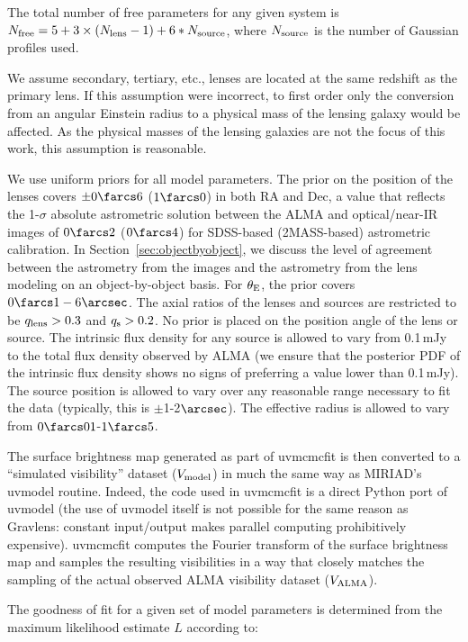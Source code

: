 \documentclass[iop]{emulateapj}
\begin{document}
The total number of free parameters for any given system is $N_{\rm free} = 5 +
3 \times (N_{\rm lens} - 1) + 6 * N_{\rm source}$, where $N_{\rm source}$ is
the number of Gaussian profiles used.

We assume secondary, tertiary, etc., lenses are located at the same redshift as
the primary lens.  If this assumption were incorrect, to first order only the
conversion from an angular Einstein radius to a physical mass of the lensing
galaxy would be affected.  As the physical masses of the lensing galaxies are
not the focus of this work, this assumption is reasonable.

We use uniform priors for all model parameters.  The prior on the position of
the lenses covers $\pm0\farcs6$ ($1\farcs0$) in both RA and Dec, a value that
reflects the 1-$\sigma$ absolute astrometric solution between the ALMA and
optical/near-IR images of $0\farcs2$ ($0\farcs4$) for SDSS-based (2MASS-based)
astrometric calibration.  In Section~\ref{sec:objectbyobject}, we discuss the
level of agreement between the astrometry from the images and the astrometry
from the lens modeling on an object-by-object basis.  For $\theta_{\rm E}$, the
prior covers $0\farcs1 - 6\arcsec$.  The axial ratios of the lenses and sources
are restricted to be $q_{\rm lens} > 0.3$ and $q_{\rm s} > 0.2$. No prior is
placed on the position angle of the lens or source.  The intrinsic flux density
for any source is allowed to vary from 0.1$\,$mJy to the total flux density
observed by ALMA (we ensure that the posterior PDF of the intrinsic flux
density shows no signs of preferring a value lower than 0.1$\,$mJy).  The
source position is allowed to vary over any reasonable range necessary to fit
the data (typically, this is $\pm $1-2$\arcsec$).  The effective radius is
allowed to vary from $0\farcs01 $-$ 1\farcs5$.

The surface brightness map generated as part of {\sc uvmcmcfit} is then
converted to a ``simulated visibility'' dataset ($V_{\rm model}$) in much the
same way as MIRIAD's {\sc uvmodel} routine.  Indeed, the code used in {\sc
uvmcmcfit} is a direct Python port of {\sc uvmodel} (the use of {\sc uvmodel}
itself is not possible for the same reason as {\sc Gravlens}: constant
input/output makes parallel computing prohibitively expensive).  {\sc
uvmcmcfit} computes the Fourier transform of the surface brightness map and
samples the resulting visibilities in a way that closely matches the sampling
of the actual observed ALMA visibility dataset ($V_{\rm ALMA}$).

The goodness of fit for a given set of model parameters is determined from the
maximum likelihood estimate $L$ according to:
\end{document}
